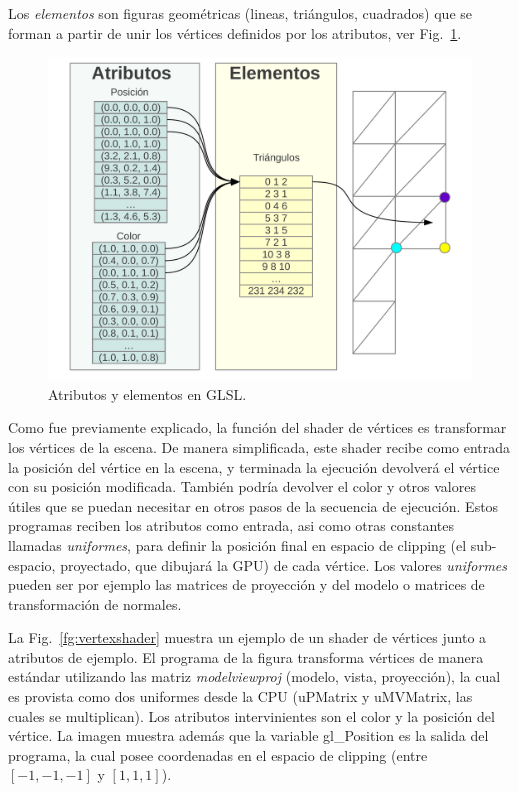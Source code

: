 Los \emph{elementos} son figuras geométricas (lineas, triángulos, cuadrados) que se forman a partir de unir los vértices definidos por los atributos, ver Fig.~\ref{fg:atributos}.

\begin{figure}[h]
\begin{center}
\includegraphics[width=13cm]{figures/atributos}
\end{center}
\caption{Atributos y elementos en GLSL.}
\label{fg:atributos}
\end{figure}

Como fue previamente explicado, la funci\'on del shader de vértices es transformar los v\'ertices de la escena.
De manera simplificada, este shader recibe como entrada la posici\'on del v\'ertice en la escena, y terminada la ejecuci\'on devolver\'a el v\'ertice con su posici\'on modificada.
Tambi\'en podr\'ia devolver el color y otros valores \'utiles que se puedan necesitar en otros pasos de la secuencia de ejecución.
Estos programas reciben los atributos como entrada, asi como otras constantes llamadas \emph{uniformes}, para definir la posición final en espacio de clipping (el sub-espacio, proyectado, que dibujará la GPU) de cada vértice.
Los valores \emph{uniformes} pueden ser por ejemplo las matrices de proyección y del modelo o matrices de transformación de normales. 

La Fig.~\ref{fg:vertexshader} muestra un ejemplo de un shader de vértices junto a atributos de ejemplo.
El programa de la figura transforma vértices de manera estándar utilizando las matriz {\em modelviewproj} (modelo, vista, proyección), la cual es provista como dos uniformes desde la CPU (uPMatrix y uMVMatrix, las cuales se multiplican).
Los atributos intervinientes son el color y la posición del vértice.
La imagen muestra además que la variable gl\_Position es la salida del programa, la cual posee coordenadas en el espacio de clipping (entre $[-1,-1,-1]$ y $[1,1,1]$).

